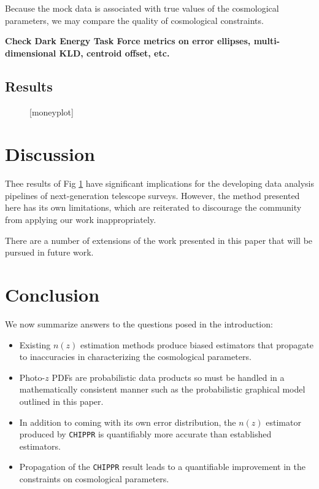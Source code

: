 \documentclass[iop]{emulateapj}
\newcommand{\chippr}{\texttt{CHIPPR} }
\begin{document}
Because the mock data is associated with true values of the cosmological 
parameters, we may compare the quality of cosmological constraints.

\textbf{Check Dark Energy Task Force metrics on error ellipses, 
multi-dimensional KLD, centroid offset, etc.}

\subsection{Results}
\label{sec:results}

\begin{figure}
	\begin{center}
		\caption{[moneyplot]}
		\label{fig:money}
	\end{center}
\end{figure}

\section{Discussion}
\label{sec:discussion}

Thee results of Fig \ref{fig:money} have significant implications for the 
developing data analysis pipelines of next-generation telescope surveys.  
However, the method presented here has its own limitations, which are 
reiterated to discourage the community from applying our work inappropriately.

There are a number of extensions of the work presented in this paper that will 
be pursued in future work.

\section{Conclusion}
\label{sec:conclusion}

We now summarize answers to the questions posed in the introduction:

\begin{itemize}
	\item Existing $n(z)$ estimation methods produce biased estimators that 
propagate to inaccuracies in characterizing the cosmological parameters.
	\item Photo-$z$ PDFs are probabilistic data products so must be handled 
in a mathematically consistent manner such as the probabilistic graphical model 
outlined in this paper.
	\item In addition to coming with its own error distribution, the $n(z)$ 
estimator produced by \chippr is quantifiably more accurate than established 
estimators.
	\item Propagation of the \chippr result leads to a quantifiable 
improvement in the constraints on cosmological parameters.
\end{itemize}
\end{document}
